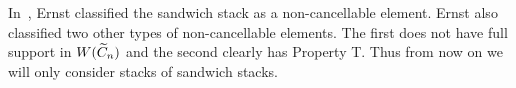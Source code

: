 In~\cite{Ernst2010}, Ernst classified the sandwich stack as a non-cancellable element. Ernst also classified two other types of non-cancellable elements. The first does not have full support in $W(\widetilde{C}_n)$ and the second clearly has Property T. Thus from now on we will only consider stacks of sandwich stacks.
%
%	
%	
%
%	
%	

